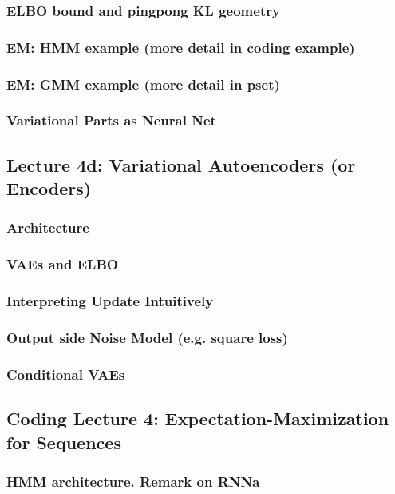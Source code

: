 \documentclass[12pt]{article}
\begin{document}
      \subsubsection*{ELBO bound and pingpong KL geometry}
      \subsubsection*{EM: HMM example (more detail in coding example)}
      \subsubsection*{EM: GMM example (more detail in pset)}
      \subsubsection*{Variational Parts as Neural Net}
    \newpage

    \subsection*{Lecture 4d: Variational Autoencoders (or Encoders)} %
      \subsubsection*{Architecture} %
      \subsubsection*{VAEs and ELBO}
      \subsubsection*{Interpreting Update Intuitively}
      \subsubsection*{Output side Noise Model (e.g. square loss)}
      \subsubsection*{Conditional VAEs}
    \newpage

    \subsection*{Coding Lecture 4: Expectation-Maximization for Sequences}
      \subsubsection*{HMM architecture.  Remark on RNNa}
\end{document}
